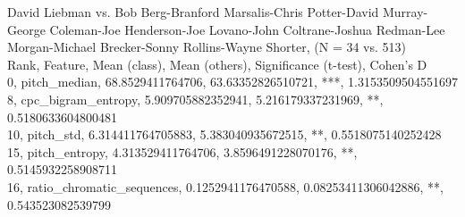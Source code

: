 David Liebman vs. Bob Berg-Branford Marsalis-Chris Potter-David Murray-George Coleman-Joe Henderson-Joe Lovano-John Coltrane-Joshua Redman-Lee Morgan-Michael Brecker-Sonny Rollins-Wayne Shorter, (N = 34 vs. 513)\\
Rank, Feature, Mean (class), Mean (others), Significance (t-test), Cohen's D\\
0, pitch_median, 68.8529411764706, 63.63352826510721, ***, 1.3153509504551697\\
8, cpc_bigram_entropy, 5.909705882352941, 5.216179337231969, **, 0.5180633604800481\\
10, pitch_std, 6.314411764705883, 5.383040935672515, **, 0.5518075140252428\\
15, pitch_entropy, 4.313529411764706, 3.8596491228070176, **, 0.5145932258908711\\
16, ratio_chromatic_sequences, 0.1252941176470588, 0.08253411306042886, **, 0.543523082539799\\
